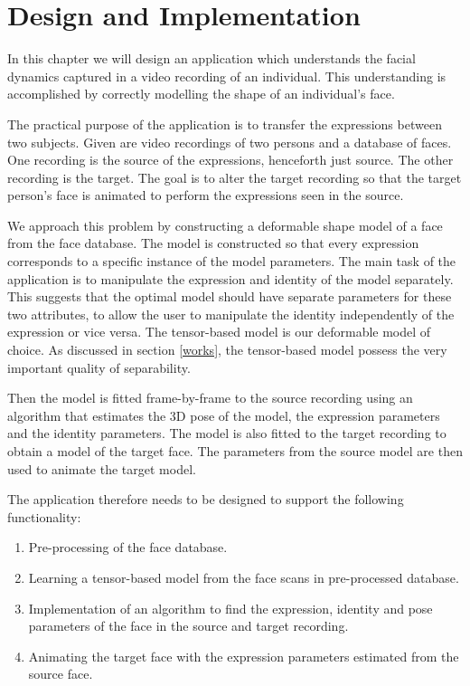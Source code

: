 \documentclass[11pt,a4paper]{report}
\begin{document}
\chapter{Design and Implementation}\label{design}
In this chapter we will design an application which understands the facial
dynamics captured in a video recording of an individual. This understanding is
accomplished by correctly modelling the shape of an individual's face.

The practical purpose of the application is to transfer the expressions between two
subjects. Given are video recordings of two persons and a database of
faces. One recording is the source of the expressions, henceforth just source. The
other recording is the target. The goal is to alter the target recording so that
the target person's face is animated to perform the expressions seen in the
source.

We approach this problem by constructing a deformable shape model of a face from the
face database. The model is constructed so that every expression corresponds to a specific instance of the model
parameters. The main task of the application is to manipulate the expression and
identity of the model separately. This suggests that the optimal model should have
separate parameters for these two attributes, to allow the user to manipulate
the identity independently of the expression or vice versa.
The tensor-based model is our deformable model of choice. As discussed in
section \ref{works}, the tensor-based model possess the very
important quality of separability.

Then the model is fitted frame-by-frame to the source recording using an
algorithm that estimates the 3D pose of the model, the expression parameters and
the identity parameters. The model is also fitted to the target recording to obtain a model of the target face. The
parameters from the source model are then used to animate the target model.

The application therefore needs to be designed to support the following functionality:

\begin{enumerate}
\item Pre-processing of the face database.
\item Learning a tensor-based model from the face scans in pre-processed database.
\item Implementation of an algorithm to find the expression, identity and pose
  parameters of the face in the source and target recording.
\item Animating the target face with the expression parameters estimated from
  the source face.
\end{enumerate}
\end{document}
